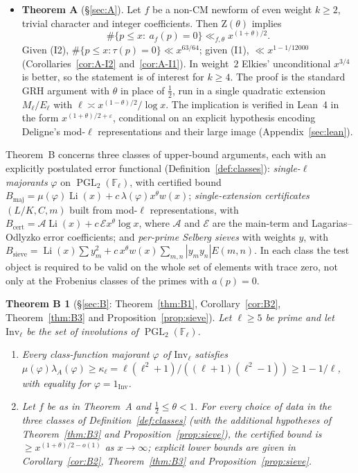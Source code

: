 \documentclass[11pt]{amsart}
\newtheorem*{thmBsummary}{Theorem B}
\theoremstyle{definition}
\theoremstyle{remark}
\newcommand{\F}{\mathbb{F}}
\DeclareMathOperator{\PGL}{PGL}
\DeclareMathOperator{\Li}{Li}
\newcommand{\Inv}{\mathrm{Inv}}
\newcommand{\Zt}{\mathrm{Z}}       %
\newcommand{\cA}{\mathcal{A}}      %
\newcommand{\cE}{\mathcal{E}}      %
\begin{document}
\begin{itemize}[leftmargin=*]
\item \textbf{Theorem A} (\S\ref{sec:A}). Let $f$ be a non-CM newform of even weight $k\ge 2$, trivial character and
  integer coefficients. Then $\Zt(\theta)$ implies
  \[\#\{p\le x:\ a_f(p)=0\}\ll_{f,\theta} x^{(1+\theta)/2}.\]
  Given (I2), $\#\{p\le x:\tau(p)=0\}\ll x^{63/64}$; given (I1), $\ll x^{1-1/12000}$ (Corollaries~\ref{cor:A-I2}
  and~\ref{cor:A-I1}). In weight~$2$ Elkies' unconditional $x^{3/4}$ is better, so the statement is of interest for
  $k\ge4$. The proof is the standard GRH argument with $\theta$ in place of $\tfrac12$, run in a single quadratic
  extension $M_\ell/E_\ell$ with $\ell\asymp x^{(1-\theta)/2}/\log x$. The implication is verified in Lean~4 in the
  form $x^{(1+\theta)/2+\varepsilon}$, conditional on an explicit hypothesis encoding Deligne's mod-$\ell$
  representations and their large image (Appendix~\ref{sec:lean}).
\end{itemize}

Theorem~B concerns three classes of upper-bound arguments, each with an explicitly postulated error functional
(Definition~\ref{def:classes}): \emph{single-$\ell$ majorants} $\varphi$ on $\PGL_2(\F_\ell)$, with certified bound
$B_{\mathrm{maj}}=\mu(\varphi)\Li(x)+c\,\lambda(\varphi)x^\theta w(x)$; \emph{single-extension certificates} $(L/K,C,m)$
built from mod-$\ell$ representations, with $B_{\mathrm{cert}}=\cA\Li(x)+c\,\cE x^\theta\log x$, where $\cA$ and
$\cE$ are the main-term and Lagarias--Odlyzko error coefficients; and \emph{per-prime Selberg sieves} with weights
$y$, with $B_{\mathrm{sieve}}=\Li(x)\sum y_m^2+c\,x^\theta w(x)\sum_{m,n}|y_my_n|E(m,n)$. In each class the test
object is required to be valid on the whole set of elements with trace zero, not only at the Frobenius classes of the
primes with $a(p)=0$.

\begin{thmBsummary}[\S\ref{sec:B}: Theorem~\ref{thm:B1}, Corollary~\ref{cor:B2}, Theorem~\ref{thm:B3} and
Proposition~\ref{prop:sieve}]
Let $\ell\ge5$ be prime and let $\Inv_\ell$ be the set of involutions of $\PGL_2(\F_\ell)$.
\begin{enumerate}[label=(\roman*)]
\item Every class-function majorant $\varphi$ of $\Inv_\ell$ satisfies $\mu(\varphi)\lambda_A(\varphi)\ge\kappa_\ell
  =\ell(\ell^2+1)/((\ell+1)(\ell^2-1))\ge1-1/\ell$, with equality for $\varphi=1_{\Inv}$.
\item Let $f$ be as in Theorem~A and $\tfrac12\le\theta<1$. For every choice of data in the three classes of
  Definition~\ref{def:classes} (with the additional hypotheses of Theorem~\ref{thm:B3} and
Proposition~\ref{prop:sieve}), the certified bound is
  $\ge x^{(1+\theta)/2-o(1)}$ as $x\to\infty$; explicit lower bounds are given in Corollary~\ref{cor:B2},
  Theorem~\ref{thm:B3} and Proposition~\ref{prop:sieve}.
\end{enumerate}
\end{thmBsummary}
\end{document}
